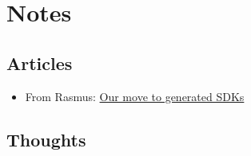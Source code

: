 \section*{Notes}

\subsection*{Articles}
\begin{itemize}
    \item From Rasmus: \href{https://github.blog/2024-01-03-our-move-to-generated-sdks/}{Our move to generated SDKs}
\end{itemize}

\subsection*{Thoughts}
